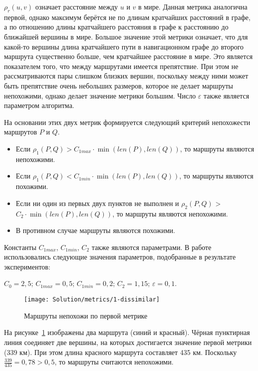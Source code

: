 $\rho_r(u, v)$ означает расстояние между $u$ и $v$ в мире. Данная
метрика аналогична первой, однако максимум берётся не по длинам
кратчайших расстояний в графе, а по отношению длины кратчайшего
расстояния в графе к расстоянию до ближайшей вершины в мире. Большое
значение этой метрики означает, что для какой-то вершины длина кратчайшего
пути в навигационном графе до второго маршрута существенно больше, чем
кратчайшее расстояние в мире. Это является показателем того, что между
маршрутами имеется препятствие. При этом не рассматриваются пары
слишком близких вершин, поскольку между ними может быть препятствие
очень небольших размеров, которое не делает маршруты непохожими,
однако делает значение метрики большим. Число $\varepsilon$ также
является параметром алгоритма.

На основании этих двух метрик формируется следующий критерий
непохожести маршрутов $P$ и $Q$.
\begin{itemize}
  \item Если $\rho_1(P, Q) > C_{1max} \cdot \min(len(P), len(Q))$, то
    маршруты являются непохожими.
  \item Если $\rho_1(P, Q) < C_{1min} \cdot \min(len(P), len(Q))$, то
    маршруты являются похожими.
  \item Если ни один из первых двух пунктов не выполнен и $\rho_2(P,
    Q)$ > $C_2 \cdot \min(len(P), len(Q))$, то маршруты являются непохожими.

  \item В противном случае маршруты являются похожими.
\end{itemize}

Константы $C_{1max}$, $C_{1min}$, $C_2$ также являются параметрами. В
работе использовались следующие значения параметров, подобранные в результате экспериментов:

$C_0 = 2,5$; $C_{1max} = 0,5$; $C_{1min} = 0,2$; $C_2 = 1,15$;
$\varepsilon = 0,1$.

\begin{figure}
    \texttt{[image: Solution/metrics/1-dissimilar]}
    \caption{Маршруты непохожи по первой метрике}
    \label{fig:1-dissimilar}
\end{figure}

На рисунке~\ref{fig:1-dissimilar} изображены два маршрута (синий и
красный). Чёрная пунктирная линия соединяет две вершины, на которых
достигается значение первой метрики (339 км). При этом длина красного
маршрута составляет 435 км. Поскольку $\frac{339}{435} = 0,78 > 0,5$,
то маршруты считаются непохожими.


